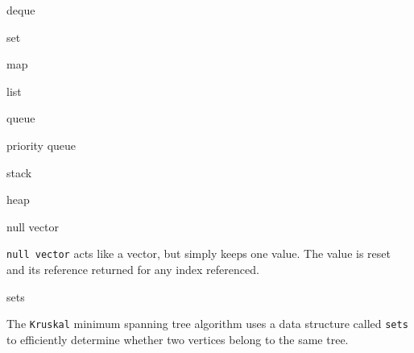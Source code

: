 \begin{algorithm}{deque}
\end{algorithm}

\begin{algorithm}{set}
\end{algorithm}

\begin{algorithm}{map}
\end{algorithm}

\begin{algorithm}{list}
\end{algorithm}

\begin{algorithm}{queue}
\end{algorithm}

\begin{algorithm}{priority queue}
\end{algorithm}

\begin{algorithm}{stack}
\end{algorithm}

\begin{algorithm}{heap}
\end{algorithm}

\begin{algorithm}{null vector}

\desc
{\tt null vector} acts like a vector, but simply keeps one value.
The value is reset and its reference returned for any index referenced.
\end{algorithm}

\begin{algorithm}{sets}

\desc
The {\tt Kruskal} minimum spanning tree algorithm uses a data structure
called {\tt sets} to efficiently determine whether two vertices belong to
the same tree.
\end{algorithm}

